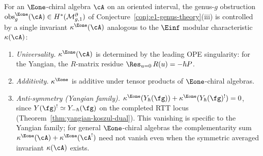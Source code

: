 \begin{conjecture}\label{conj:e1-theorem-D}
For an $\Eone$-chiral algebra $\cA$ on an oriented interval, the
genus-$g$ obstruction
$\mathrm{obs}_g^{\Eone}(\cA) \in
H^*(\mathcal{M}_{g,1}^{\partial})$
of Conjecture~\textup{\ref{conj:e1-genus-theory}(iii)} is
controlled by a single invariant $\kappa^{\Eone}(\cA)$ analogous to
the $\Einf$ modular characteristic $\kappa(\cA)$:
\begin{enumerate}[label=\textup{(\roman*)}]
\item \emph{Universality.}
 $\kappa^{\Eone}(\cA)$ is determined by the leading OPE
 singularity: for the Yangian, the $R$-matrix
 residue $\Res_{u=0}\,R(u) = -\hbar P$.
\item \emph{Additivity.}
 $\kappa^{\Eone}$ is additive under tensor products of
 $\Eone$-chiral algebras.
\item \emph{Anti-symmetry \textup{(}Yangian family\textup{)}.}
 $\kappa^{\Eone}(Y_\hbar(\fg)) + \kappa^{\Eone}(Y_\hbar(\fg)^!) = 0$,
 since $Y(\fg)^! \simeq Y_{-\hbar}(\fg)$ on the completed RTT locus
 \textup{(}Theorem~\textup{\ref{thm:yangian-koszul-dual})}.
 This vanishing is specific to the Yangian family; for
 general $\Eone$-chiral algebras the complementarity sum
 $\kappa^{\Eone}(\cA) + \kappa^{\Eone}(\cA^!)$ need not vanish
 even when the symmetric averaged invariant $\kappa(\cA)$ exists.
\end{enumerate}
\end{conjecture}

